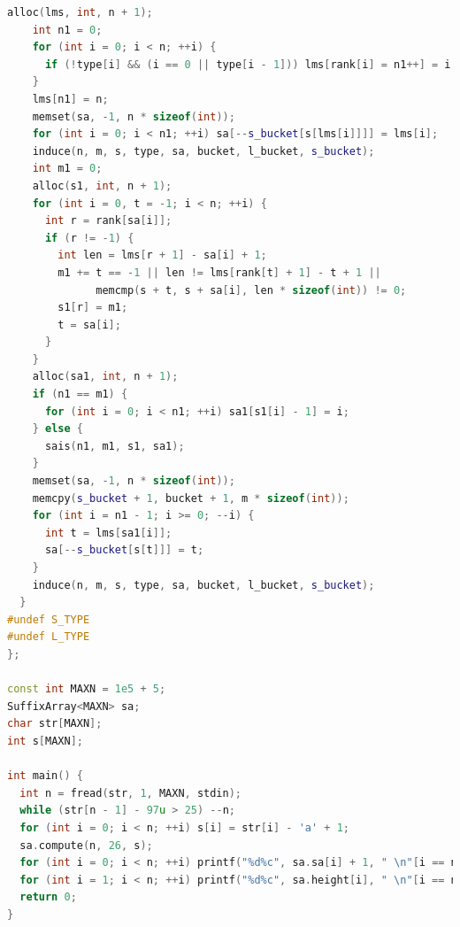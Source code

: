 \documentclass[twoside]{article}
\begin{document}
\begin{lstlisting}[language=c++]
    alloc(lms, int, n + 1);
    int n1 = 0;
    for (int i = 0; i < n; ++i) {
      if (!type[i] && (i == 0 || type[i - 1])) lms[rank[i] = n1++] = i;
    }
    lms[n1] = n;
    memset(sa, -1, n * sizeof(int));
    for (int i = 0; i < n1; ++i) sa[--s_bucket[s[lms[i]]]] = lms[i];
    induce(n, m, s, type, sa, bucket, l_bucket, s_bucket);
    int m1 = 0;
    alloc(s1, int, n + 1);
    for (int i = 0, t = -1; i < n; ++i) {
      int r = rank[sa[i]];
      if (r != -1) {
        int len = lms[r + 1] - sa[i] + 1;
        m1 += t == -1 || len != lms[rank[t] + 1] - t + 1 ||
              memcmp(s + t, s + sa[i], len * sizeof(int)) != 0;
        s1[r] = m1;
        t = sa[i];
      }
    }
    alloc(sa1, int, n + 1);
    if (n1 == m1) {
      for (int i = 0; i < n1; ++i) sa1[s1[i] - 1] = i;
    } else {
      sais(n1, m1, s1, sa1);
    }
    memset(sa, -1, n * sizeof(int));
    memcpy(s_bucket + 1, bucket + 1, m * sizeof(int));
    for (int i = n1 - 1; i >= 0; --i) {
      int t = lms[sa1[i]];
      sa[--s_bucket[s[t]]] = t;
    }
    induce(n, m, s, type, sa, bucket, l_bucket, s_bucket);
  }
#undef S_TYPE
#undef L_TYPE
};

const int MAXN = 1e5 + 5;
SuffixArray<MAXN> sa;
char str[MAXN];
int s[MAXN];

int main() {
  int n = fread(str, 1, MAXN, stdin);
  while (str[n - 1] - 97u > 25) --n;
  for (int i = 0; i < n; ++i) s[i] = str[i] - 'a' + 1;
  sa.compute(n, 26, s);
  for (int i = 0; i < n; ++i) printf("%d%c", sa.sa[i] + 1, " \n"[i == n - 1]);
  for (int i = 1; i < n; ++i) printf("%d%c", sa.height[i], " \n"[i == n - 1]);
  return 0;
}

\end{lstlisting}
\end{document}
